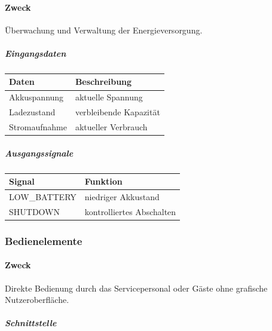 \paragraph{Zweck}\label{zweck-5}

Überwachung und Verwaltung der Energieversorgung.

\subparagraph{Eingangsdaten}\label{eingangsdaten}

\begin{longtable}[]{@{}ll@{}}
\toprule\noalign{}
Daten & Beschreibung \\
\midrule\noalign{}
\endhead
\bottomrule\noalign{}
\endlastfoot
Akkuspannung & aktuelle Spannung \\
Ladezustand & verbleibende Kapazität \\
Stromaufnahme & aktueller Verbrauch \\
\end{longtable}

\subparagraph{Ausgangssignale}\label{ausgangssignale}

\begin{longtable}[]{@{}ll@{}}
\toprule\noalign{}
Signal & Funktion \\
\midrule\noalign{}
\endhead
\bottomrule\noalign{}
\endlastfoot
LOW\_BATTERY & niedriger Akkustand \\
SHUTDOWN & kontrolliertes Abschalten \\
\end{longtable}

\subsubsection{Bedienelemente}\label{bedienelemente-1}

\paragraph{Zweck}\label{zweck-6}

Direkte Bedienung durch das Servicepersonal oder Gäste ohne grafische
Nutzeroberfläche.

\subparagraph{Schnittstelle}\label{schnittstelle-5}

